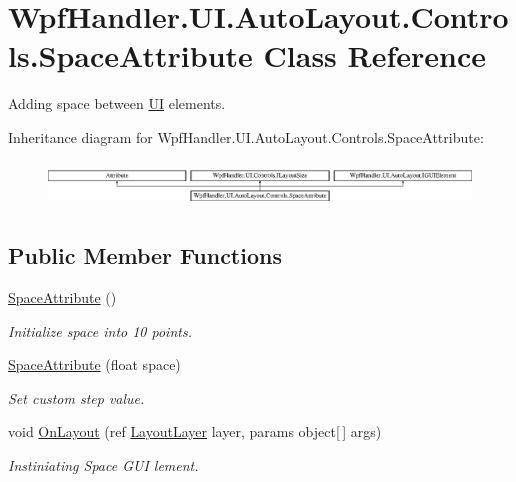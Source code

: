 \hypertarget{class_wpf_handler_1_1_u_i_1_1_auto_layout_1_1_controls_1_1_space_attribute}{}\section{Wpf\+Handler.\+U\+I.\+Auto\+Layout.\+Controls.\+Space\+Attribute Class Reference}
\label{class_wpf_handler_1_1_u_i_1_1_auto_layout_1_1_controls_1_1_space_attribute}


Adding space between \mbox{\hyperlink{namespace_wpf_handler_1_1_u_i}{UI}} elements.  


Inheritance diagram for Wpf\+Handler.\+U\+I.\+Auto\+Layout.\+Controls.\+Space\+Attribute\+:\begin{figure}[H]
\begin{center}
\leavevmode
\includegraphics[height=1.212121cm]{d8/df1/class_wpf_handler_1_1_u_i_1_1_auto_layout_1_1_controls_1_1_space_attribute}
\end{center}
\end{figure}
\subsection*{Public Member Functions}
\begin{DoxyCompactItemize}
\item 
\mbox{\hyperlink{class_wpf_handler_1_1_u_i_1_1_auto_layout_1_1_controls_1_1_space_attribute_a074e315606e279957f2a10c9c86e2094}{Space\+Attribute}} ()
\begin{DoxyCompactList}\small\item\em Initialize space into 10 points. \end{DoxyCompactList}\item 
\mbox{\hyperlink{class_wpf_handler_1_1_u_i_1_1_auto_layout_1_1_controls_1_1_space_attribute_a4c2a99ed228d57fa34d0641003d568e6}{Space\+Attribute}} (float space)
\begin{DoxyCompactList}\small\item\em Set custom step value. \end{DoxyCompactList}\item 
void \mbox{\hyperlink{class_wpf_handler_1_1_u_i_1_1_auto_layout_1_1_controls_1_1_space_attribute_abc4dedcaa52529fb4f0e227fb2386866}{On\+Layout}} (ref \mbox{\hyperlink{class_wpf_handler_1_1_u_i_1_1_auto_layout_1_1_layout_layer}{Layout\+Layer}} layer, params object\mbox{[}$\,$\mbox{]} args)
\begin{DoxyCompactList}\small\item\em Instiniating Space G\+UI lement. \end{DoxyCompactList}\end{DoxyCompactItemize}

